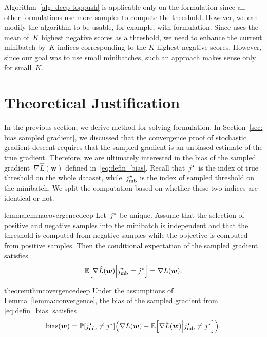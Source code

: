 \begin{note}\label{note: deep extension}
  Algorithm~\ref{alg: deep toppush} is applicable only on the \TopPush formulation since all other formulations use more samples to compute the threshold. However, we can modify the algorithm to be usable, for example, with \TopPushK formulation. Since \TopPushK uses the mean of~$K$ highest negative scores as a threshold, we need to enhance the current minibatch by~$K$ indices corresponding to the $K$ highest negative scores. However, since our goal was to use small minibatches, such an approach makes sense only for small~$K.$ 
\end{note}

\section{Theoretical Justification}

In the previous section, we derive \DeepTopPush method for solving \TopPush formulation. In Section~\ref{sec: bias sampled gradient}, we discussed that the convergence proof of stochastic gradient descent requires that the sampled gradient is an unbiased estimate of the true gradient. Therefore, we are ultimately interested in the bias of the sampled gradient~$\nabla \hat{L}(\bm{w})$ defined in~\eqref{eq:defin_bias}. Recall that~$j^{\star}$ is the index of true threshold on the whole dataset, while~$j^{\star}_{\text{mb}}$ is the index of sampled threshold on the minibatch. We split the computation based on whether these two indices are identical or not.

\begin{restatable}{lemma}{lemmacovergencedeep}\label{lemma:convergence}
  Let~$j^{\star}$ be unique. Assume that the selection of positive and negative samples into the minibatch is independent and that the threshold is computed from negative samples while the objective is computed from positive samples. Then the conditional expectation of the sampled gradient satisfies
  \begin{equation*}
    \EE\Brac[s]{\nabla \hat{L}(\bm{w}) \middle\vert\indmaxmb=\indmax} =  \nabla L(\bm{w}).
  \end{equation*}
\end{restatable}

\begin{restatable}{theorem}{thmcovergencedeep}\label{theorem:convergence}
  Under the assumptions of Lemma~\ref{lemma:convergence}, the bias of the sampled gradient from \eqref{eq:defin_bias} satisfies
  \begin{equation}\label{eq:comp_bias}
    \bias(\bm{w}) = \PP\Brac[s]{\indmaxmb\neq \indmax} \Brac{\nabla L(\bm{w}) - \EE\Brac[s]{\nabla \hat{L}(\bm{w}) \middle\vert \indmaxmb\neq \indmax}}.
  \end{equation}
\end{restatable}

